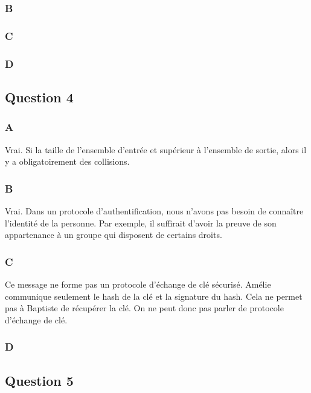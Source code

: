 \documentclass[a4paper, 11pt, oneside]{article}
\begin{document}
\subsubsection{B}

\subsubsection{C}

\subsubsection{D}

\subsection{Question 4}

\subsubsection{A}

Vrai. Si la taille de l’ensemble d'entrée et supérieur à l'ensemble de sortie, alors il y a obligatoirement des collisions. 

\subsubsection{B}

Vrai. Dans un protocole d’authentification, nous n'avons pas besoin de connaître l'identité de la personne. Par exemple, il suffirait d'avoir la preuve de son appartenance à un groupe qui disposent de certains droits. 

\subsubsection{C}

Ce message ne forme pas un protocole d'échange de clé sécurisé. Amélie communique seulement le hash de la clé et la signature du hash. Cela ne permet pas à Baptiste de récupérer la clé. On ne peut donc pas parler de protocole d'échange de clé.

\subsubsection{D}

\subsection{Question 5}
\end{document}
